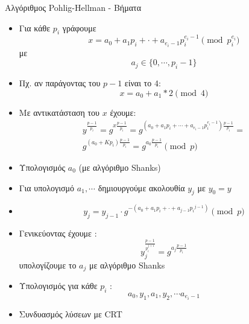 \documentclass[handout]{beamer}
\begin{document}
\begin{frame}[allowframebreaks]{Αλγόριθμος Pohlig-Hellman - Βήματα} 
\begin{itemize}
\item Για κάθε $p_i$ γράφουμε $$x = a_0+a_1 p_i+\cdot+a_{e_i-1}p_i^{e_i-1} \pmod{p_i^{e_i}}$$ με $$a_j \in \{0,\cdots,p_{i}-1\}$$  
\item Πχ. αν παράγοντας του $p-1$ είναι το $4$: $$x = a_0 + a_1 *2 \pmod{4}$$
\item Με αντικατάσταση του $x$ έχουμε: 
\begin{align*} y^\frac{p-1}{p_i} = g^{x\frac{p-1}{p_i}} = g^{ (a_0+a_1 p_i+\cdots+a_{e_i-1}p_i^{e_i-1}) \frac{p-1}{p_i}}  =\\   g^{ (a_0+Kp_i) \frac{p-1}{p_i}} = g^{a_0\frac{p-1}{p_i}} \pmod{p} \end{align*}
\item Υπολογισμός $a_0$ (με αλγόριθμο Shanks) \framebreak
\item Για υπολογισμό $a_1,\cdots$ δημιουργούμε ακολουθία $y_j$ με $y_0=y$  
\item $$y_{j} = y_{j-1} \cdot g^{-(a_0+a_1p_i+\cdot+a_{j-1}{p_i}^{j-1})} \pmod{p}$$
\item Γενικεύοντας έχουμε : $$y_{j}^\frac{p-1}{p_i^{j+1}} = g^{a_j \frac{p-1}{p_i}}$$ υπολογίζουμε το $a_j$ με αλγόριθμο Shanks 
\item Υπολογισμός για κάθε $p_i$ : $$ a_0, y_1, a_1, y_2, \cdots a_{e_i-1}$$
\item Συνδυασμός λύσεων με CRT  
\end{itemize}
\end{frame}
\end{document}
